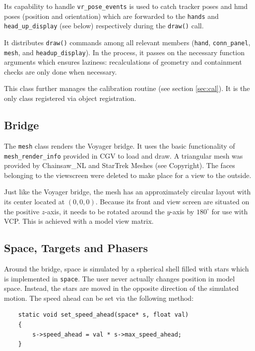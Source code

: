 \documentclass[hyperref, bachelorofscience]{cgvpub}
\begin{document}
Its capability to handle \lstinline|vr_pose_events| is used to catch tracker poses and \acrshort{hmd} poses (position and orientation) which are forwarded to the \lstinline|hands| and \lstinline|head_up_display| (see below) respectively during the \lstinline|draw()| call. 

It distributes \lstinline|draw()| commands among all relevant members (\lstinline|hand|, \lstinline|conn_panel|, \lstinline|mesh|, and \lstinline|headup_display|). In the process, it passes on the necessary function arguments which ensures laziness: recalculations of geometry and containment checks are only done when necessary.

This class further manages the calibration routine (see section \ref{sec:cal}). It is the only class registered via object registration.

\subsection{Bridge}
The \lstinline|mesh| class renders the Voyager bridge. It uses the basic functionality of \lstinline|mesh_render_info| provided in \gls{CGV} to load and draw. A triangular mesh was provided by Chainsaw\_NL and StarTrek Meshes (see Copyright). The faces belonging to the viewscreen were deleted to make place for a view to the outside.

Just like the Voyager bridge, the mesh has an approximately circular layout with its center located at $ (0, 0, 0) $. Because its front and view screen are situated on the positive $ z $-axis, it needs to be rotated around the $ y $-axis by $ 180^{\circ} $ for use with \gls{VCP}. This is achieved with a model view matrix.

\subsection{Space, Targets and Phasers}
Around the bridge, space is simulated by a spherical shell filled with stars which is implemented in \lstinline|space|. The user never actually changes position in model space. Instead, the stars are moved in the opposite direction of the simulated motion. The speed ahead can be set via the following method: 
\vspace{.3cm}
\begin{lstlisting}
	static void set_speed_ahead(space* s, float val) 
	{ 
		s->speed_ahead = val * s->max_speed_ahead; 
	}
\end{lstlisting}
\end{document}
